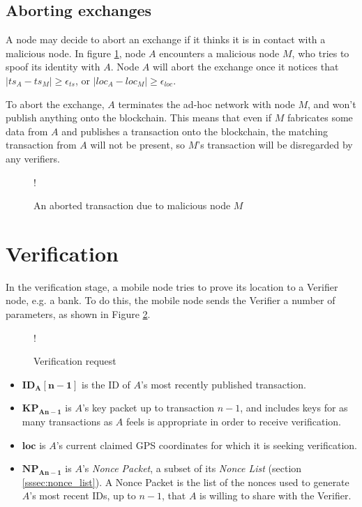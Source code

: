 \subsection{Aborting exchanges} \label{ssec:aborting_exchanges}
A node may decide to abort an exchange if it thinks it is in contact with a malicious node. In figure \ref{fig:aborted_transaction}, node $A$ encounters a malicious node $M$, who tries to spoof its identity with $A$. Node $A$ will abort the exchange once it notices that $|ts_A-ts_M| \geq \epsilon_{ts}$, or $|loc_A-loc_M| \geq \epsilon_{loc}$.

To abort the exchange, $A$ terminates the ad-hoc network with node $M$, and won't publish anything onto the blockchain. This means that even if $M$ fabricates some data from $A$ and publishes a transaction onto the blockchain, the matching transaction from $A$ will not be present, so $M$'s transaction will be disregarded by any verifiers.

\begin{figure}
\resizebox {\columnwidth} {!} {}
\caption{An aborted transaction due to malicious node $M$}
\label{fig:aborted_transaction}
\end{figure}

\clearpage
\section{Verification} \label{ssec:verification}
In the verification stage, a mobile node tries to prove its location to a Verifier node, e.g. a bank. To do this, the mobile node sends the Verifier a number of parameters, as shown in Figure \ref{fig:verify_request}.

\begin{figure}[H]
\begin{center}
 {!} {}
\caption{Verification request}
\label{fig:verify_request}
\end{center}
\end{figure}

\begin{itemize}[noitemsep,topsep=0pt]
	\item[] $\mathbf{ID_{A}[n-1]}$ is the ID of $A$'s most recently published transaction.
	\item[] $\mathbf{KP_{An-1}}$ is $A$'s key packet up to transaction $n-1$, and includes keys for as many transactions as $A$ feels is appropriate in order to receive verification.
	\item[] $\mathbf{loc}$ is $A$'s current claimed GPS coordinates for which it is seeking verification.
	\item[] $\mathbf{NP_{An-1}}$ is $A$'s \textit{Nonce Packet}, a subset of its \textit{Nonce List} (section \ref{sssec:nonce_list}). A Nonce Packet is the list of the nonces used to generate $A$'s most recent IDs, up to $n-1$, that $A$ is willing to share with the Verifier. 
\end{itemize}

